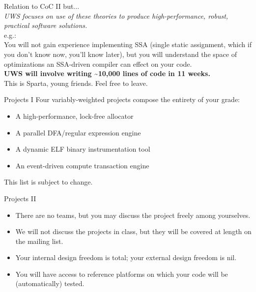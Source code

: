 \documentclass[handout]{beamer}
\begin{document}
\begin{frame}{Relation to CoC II}
but... \\
\emph{UWS focuses on {\it use} of these theories to produce high-performance,
robust, {\it practical} software solutions.}\linebreak \\
e.g.: \\
You will not gain experience implementing SSA (single static
assignment, which if you don't know now, you'll know later), but you will
understand the space of optimizations an SSA-driven compiler can effect on your
code.\linebreak \\
{\bf UWS will involve writing \~{}10,000 lines of code in 11 weeks.}\linebreak \\
This is Sparta, young friends. Feel free to leave.
\end{frame}

\begin{frame}{Projects I}
Four variably-weighted projects compose the entirety of your grade:
\vspace{.25in}
\begin{itemize}
\item A high-performance, lock-free allocator
\item A parallel DFA/regular expression engine
\item A dynamic ELF binary instrumentation tool
\item An event-driven compute transaction engine
\end{itemize}
\vspace{.25in}
This list is subject to change.
\end{frame}

\begin{frame}{Projects II}
\begin{itemize}
\item There are no teams, but you may discuss the project freely among
	yourselves.
\item We will not discuss the projects in class, but they will be
	covered at length on the mailing list.
\item Your internal design freedom is total; your external design freedom is nil.
\item You will have access to reference platforms on which your code will be
	(automatically) tested.
\end{itemize}
\end{frame}
\end{document}
